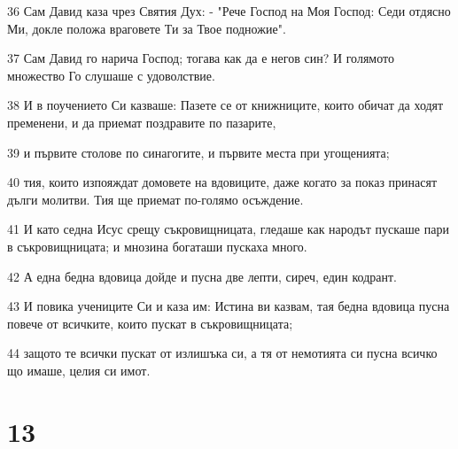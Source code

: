 \par 36 Сам Давид каза чрез Святия Дух: - "Рече Господ на Моя Господ: Седи отдясно Ми, докле положа враговете Ти за Твое подножие".
\par 37 Сам Давид го нарича Господ; тогава как да е негов син? И голямото множество Го слушаше с удоволствие.
\par 38 И в поучението Си казваше: Пазете се от книжниците, които обичат да ходят пременени, и да приемат поздравите по пазарите,
\par 39 и първите столове по синагогите, и първите места при угощенията;
\par 40 тия, които изпояждат домовете на вдовиците, даже когато за показ принасят дълги молитви. Тия ще приемат по-голямо осъждение.
\par 41 И като седна Исус срещу съкровищницата, гледаше как народът пускаше пари в съкровищницата; и мнозина богаташи пускаха много.
\par 42 А една бедна вдовица дойде и пусна две лепти, сиреч, един кодрант.
\par 43 И повика учениците Си и каза им: Истина ви казвам, тая бедна вдовица пусна повече от всичките, които пускат в съкровищницата;
\par 44 защото те всички пускат от излишъка си, а тя от немотията си пусна всичко що имаше, целия си имот.

\chapter{13}

